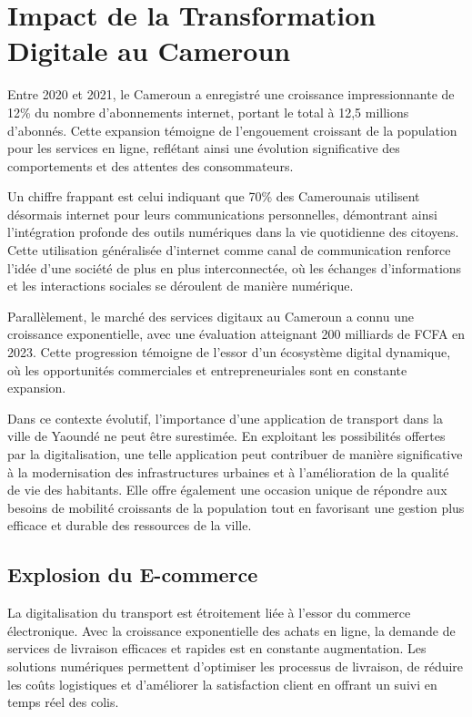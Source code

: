 \section{Impact de la Transformation Digitale au Cameroun}

Entre 2020 et 2021, le Cameroun a enregistré une croissance impressionnante de 12\% du nombre d'abonnements internet, portant le total à 12,5 millions d'abonnés. Cette expansion témoigne de l'engouement croissant de la population pour les services en ligne, reflétant ainsi une évolution significative des comportements et des attentes des consommateurs.

Un chiffre frappant est celui indiquant que 70\% des Camerounais utilisent désormais internet pour leurs communications personnelles, démontrant ainsi l'intégration profonde des outils numériques dans la vie quotidienne des citoyens. Cette utilisation généralisée d'internet comme canal de communication renforce l'idée d'une société de plus en plus interconnectée, où les échanges d'informations et les interactions sociales se déroulent de manière numérique.

Parallèlement, le marché des services digitaux au Cameroun a connu une croissance exponentielle, avec une évaluation atteignant 200 milliards de FCFA en 2023. Cette progression témoigne de l'essor d'un écosystème digital dynamique, où les opportunités commerciales et entrepreneuriales sont en constante expansion.

Dans ce contexte évolutif, l'importance d'une application de transport dans la ville de Yaoundé ne peut être surestimée. En exploitant les possibilités offertes par la digitalisation, une telle application peut contribuer de manière significative à la modernisation des infrastructures urbaines et à l'amélioration de la qualité de vie des habitants. Elle offre également une occasion unique de répondre aux besoins de mobilité croissants de la population tout en favorisant une gestion plus efficace et durable des ressources de la ville.
\subsection{Explosion du E-commerce}

La digitalisation du transport est étroitement liée à l'essor du commerce électronique. Avec la croissance exponentielle des achats en ligne, la demande de services de livraison efficaces et rapides est en constante augmentation. Les solutions numériques permettent d'optimiser les processus de livraison, de réduire les coûts logistiques et d'améliorer la satisfaction client en offrant un suivi en temps réel des colis.

